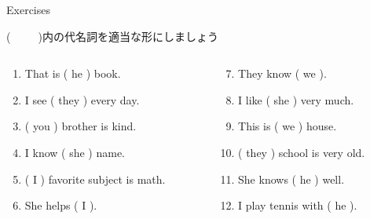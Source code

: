 \documentclass[aspectratio=169,xcolor={dvipsnames,table}]{beamer}
\begin{document}
\begin{frame}[plain]{Exercises}

{\small (~~~~~)内の代名詞を適当な形にしましょう}

\begin{columns}[t]
 \begin{column}{.45\textwidth}
   \begin{enumerate}
  \item That is ( he ) book.\hfill{}
  \item I see ( they ) every day.\hfill{}
  \item ( you ) brother is kind.\hfill{}
  \item I know ( she ) name.\hfill{}
  \item ( I ) favorite subject is math.\hfill{}
  \item She helps ( I ).\hfill{}
 \end{enumerate}
 \end{column}
\begin{column}{.45\textwidth}
  \begin{enumerate}\setcounter{enumi}{6}
  \item They know ( we ).\hfill{}
  \item I like ( she ) very much.\hfill{}
  \item This is ( we ) house.\hfill{}
  \item ( they ) school is very old.\hfill{}
  \item She knows ( he ) well.\hfill{}
  \item I play tennis with ( he ).\hfill{}
 \end{enumerate}
\end{column}
\end{columns}

\end{frame}
\end{document}
